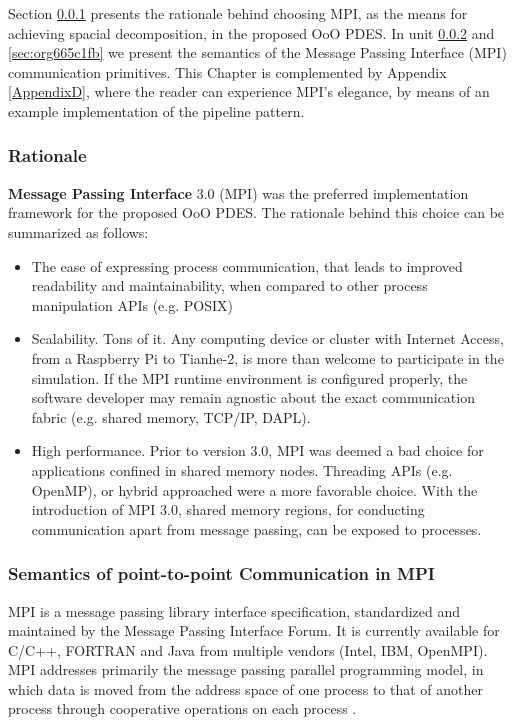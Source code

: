 \documentclass[11pt]{article}
\begin{document}
Section \ref{sec:orgfdcce79} presents the rationale behind choosing MPI, as the means for achieving spacial decomposition, in the proposed OoO PDES.
In unit \ref{sec:orgfc8b1cd} and \ref{sec:org665c1fb} we present the semantics of the Message Passing Interface (MPI) communication primitives.
This Chapter is complemented by Appendix \ref{AppendixD}, where the reader can experience MPI's elegance, by means of an example implementation of the pipeline pattern.


\subsubsection{Rationale}
\label{sec:orgfdcce79}
\textbf{Message Passing Interface} 3.0 (MPI) was the preferred implementation framework for the proposed OoO PDES.
The rationale behind this choice can be summarized as follows:
\begin{itemize}
\item The ease of expressing process communication, that leads to improved readability and maintainability, when compared to other process manipulation APIs (e.g. POSIX)
\item Scalability. Tons of it. Any computing device or cluster with Internet Access, from a Raspberry Pi to Tianhe-2, is more than welcome to participate in the simulation.
If the MPI runtime environment is configured properly, the software developer may remain agnostic about the exact communication fabric (e.g. shared memory, TCP/IP, DAPL).
\item High performance. Prior to version 3.0, MPI was deemed a bad choice for applications confined in shared memory nodes. 
Threading APIs (e.g. OpenMP), or hybrid approached were a more favorable choice.   
With the introduction of MPI 3.0, shared memory regions, for conducting communication apart from message passing, can be exposed to processes.
\end{itemize}




\subsubsection{Semantics of point-to-point Communication in MPI}
\label{sec:orgfc8b1cd}
MPI is a message passing library interface specification, standardized and maintained by the Message Passing Interface Forum.
It is currently available for C/C++, FORTRAN and Java from multiple vendors (Intel, IBM, OpenMPI).
MPI addresses primarily the message passing parallel programming model, 
in which data is moved from the address space of one process to that of another process through cooperative operations on each process \cite{MessagePassingInterfaceForum2012}.
\end{document}
